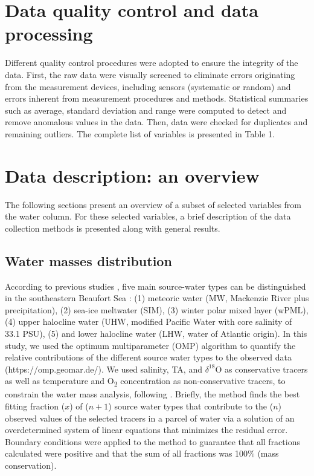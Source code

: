 \documentclass[essd, manuscript]{copernicus}
\begin{document}
\section{Data quality control and data processing}

Different quality control procedures were adopted to ensure the integrity of the data. First, the raw data were visually screened to eliminate errors originating from the measurement devices, including sensors (systematic or random) and errors inherent from measurement procedures and methods. Statistical summaries such as average, standard deviation and range were computed to detect and remove anomalous values in the data. Then, data were checked for duplicates and remaining outliers. The complete list of variables is presented in Table 1.

\section{Data description: an overview}

The following sections present an overview of a subset of selected variables from the water column. For these selected variables, a brief description of the data collection methods is presented along with general results. 

\subsection{Water masses distribution}

According to previous studies \citep{Carmack1989, Macdonald1989}, five main source-water types can be distinguished in the southeastern Beaufort Sea : (1) meteoric water (MW, Mackenzie River plus precipitation), (2) sea-ice meltwater (SIM), (3) winter polar mixed layer (wPML), (4) upper halocline water (UHW, modified Pacific Water with core salinity of 33.1 PSU), (5) and lower halocline water (LHW, water of Atlantic origin). In this study, we used the optimum multiparameter (OMP) algorithm to quantify the relative contributions of the different source water types to the observed data (https://omp.geomar.de/). We used salinity, TA, and $\delta^{18}$O as conservative tracers as well as temperature and O\textsubscript{2} concentration as non-conservative tracers, to constrain the water mass analysis, following \citet{Lansard2012}. Briefly, the method finds the best fitting fraction ($x$) of ($n+1$) source water types that contribute to the ($n$) observed values of the selected tracers in a parcel of water via a solution of an overdetermined system of linear equations that minimizes the residual error. Boundary conditions were applied to the method to guarantee that all fractions calculated were positive and that the sum of all fractions was 100\% (mass conservation).
\end{document}
